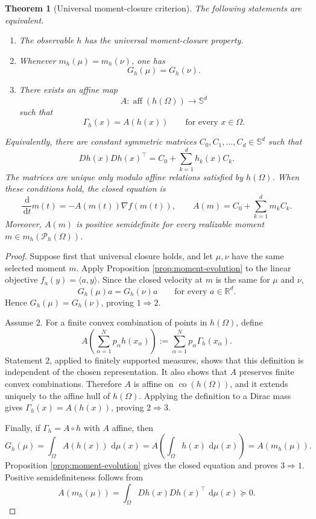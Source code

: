 \documentclass[11pt]{article}
\newcommand{\R}{\mathbb R}
\newcommand{\Sym}{\mathbb S}
\newcommand{\dd}{\,\mathrm d}
\newcommand{\cP}{\mathcal P}
\newcommand{\aff}{\operatorname{aff}}
\newcommand{\co}{\operatorname{co}}
\newtheorem{theorem}{Theorem}
\theoremstyle{remark}
\begin{document}
\begin{theorem}[Universal moment-closure criterion]
\label{thm:affine-gram}
The following statements are equivalent.
\begin{enumerate}
  \item The observable \(h\) has the universal moment-closure property.

  \item Whenever \(m_h(\mu)=m_h(\nu)\), one has
  \[
    G_h(\mu)=G_h(\nu).
  \]

  \item There exists an affine map
  \[
    A:\aff(h(\Omega))\longrightarrow\Sym^d
  \]
  such that
  \[
    \Gamma_h(x)=A(h(x))
    \qquad\text{for every }x\in\Omega.
  \]
\end{enumerate}
Equivalently, there are constant symmetric matrices
\(C_0,C_1,\ldots,C_d\in\Sym^d\) such that
\[
  \boxed{
  Dh(x)Dh(x)^\top
  =
  C_0+\sum_{k=1}^d h_k(x)C_k.
  }
\]
The matrices are unique only modulo affine relations satisfied by
\(h(\Omega)\).  When these conditions hold, the closed equation is
\[
  \boxed{
  \frac{\dd}{\dd t}m(t)
  =
  -A(m(t))\nabla f(m(t)),
  \qquad
  A(m)=C_0+\sum_{k=1}^d m_kC_k.
  }
\]
Moreover, \(A(m)\) is positive semidefinite for every realizable moment
\(m\in m_h(\cP_h(\Omega))\).
\end{theorem}

\begin{proof}
Suppose first that universal closure holds, and let \(\mu,\nu\) have the
same selected moment \(m\).  Apply Proposition
\ref{prop:moment-evolution} to the linear objective
\(f_a(y)=\langle a,y\rangle\).  Since the closed velocity at \(m\) is the
same for \(\mu\) and \(\nu\),
\[
  G_h(\mu)a=G_h(\nu)a
  \qquad\text{for every }a\in\R^d.
\]
Hence \(G_h(\mu)=G_h(\nu)\), proving \(1\Rightarrow2\).

Assume \(2\).  For a finite convex combination of points in \(h(\Omega)\),
define
\[
  A\left(\sum_{\alpha=1}^N p_\alpha h(x_\alpha)\right)
  :=
  \sum_{\alpha=1}^N p_\alpha\Gamma_h(x_\alpha).
\]
Statement \(2\), applied to finitely supported measures, shows that this
definition is independent of the chosen representation.  It also shows
that \(A\) preserves finite convex combinations.  Therefore \(A\) is affine
on \(\co(h(\Omega))\), and it extends uniquely to the affine hull of
\(h(\Omega)\).  Applying the definition to a Dirac mass gives
\(\Gamma_h(x)=A(h(x))\), proving \(2\Rightarrow3\).

Finally, if \(\Gamma_h=A\circ h\) with \(A\) affine, then
\[
  G_h(\mu)
  =
  \int_\Omega A(h(x))\,\dd\mu(x)
  =
  A\left(\int_\Omega h(x)\,\dd\mu(x)\right)
  =
  A(m_h(\mu)).
\]
Proposition \ref{prop:moment-evolution} gives the closed equation and proves
\(3\Rightarrow1\).  Positive semidefiniteness follows from
\[
  A(m_h(\mu))
  =
  \int_\Omega Dh(x)Dh(x)^\top\,\dd\mu(x)\succeq0.
\]
\end{proof}
\end{document}
